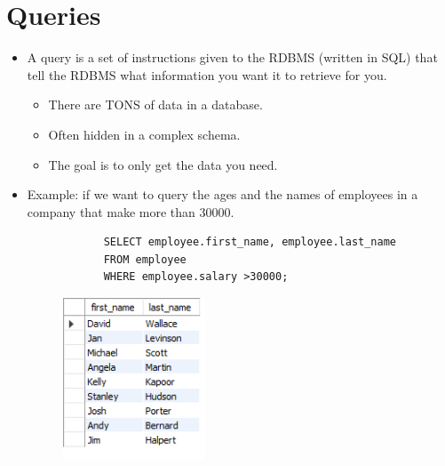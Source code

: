 \section{Queries}
\begin{itemize}
    \item A query is a set of instructions given to the RDBMS (written in SQL) that tell the RDBMS what information you want it to retrieve for you.
        \begin{itemize}
            \item There are TONS of data in a database.
            \item Often hidden in a complex schema.
            \item The goal is to only get the data you need.
        \end{itemize}
    
    \item Example: if we want to query the ages and the names of employees in a company that make more than 30000.
        \begin{verbatim}
            SELECT employee.first_name, employee.last_name 
            FROM employee 
            WHERE employee.salary >30000;
        \end{verbatim}
        \begin{figure}[H]
            \centering
            \includegraphics[width=0.4\textwidth]{./Figs/2020-12-24-20-37-08.png}
        \end{figure}
\end{itemize}
